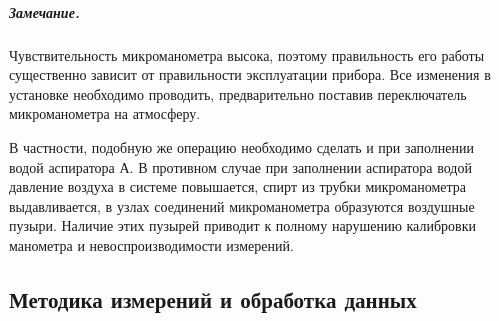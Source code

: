 \documentclass[12pt,a4paper]{article}
\begin{document}
\subparagraph*{Замечание.}Чувствительность микроманометра высока, поэтому правильность его работы существенно зависит от правильности эксплуатации прибора. Все изменения в установке необходимо проводить, предварительно поставив переключатель микроманометра на атмосферу.

В частности, подобную же операцию необходимо сделать и при заполнении водой аспиратора А. В противном случае при заполнении аспиратора водой давление воздуха в системе повышается, спирт из трубки микроманометра выдавливается, в узлах соединений микроманометра образуются воздушные пузыри. Наличие этих пузырей приводит к полному нарушению калибровки манометра и невоспроизводимости измерений.

\subsection*{Методика измерений и обработка данных}
\end{document}
